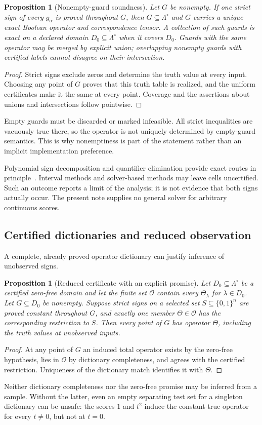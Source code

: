 \documentclass[11pt]{article}
\newtheorem{proposition}[theorem]{Proposition}
\theoremstyle{definition}
\theoremstyle{remark}
\newcommand{\B}{\{0,1\}}
\newcommand{\Oo}{\mathcal O}
\begin{document}
\begin{proposition}[Nonempty-guard soundness]\label{prop:cert}
Let $G$ be nonempty. If one strict sign of every $g_\alpha$ is proved throughout $G$, then $G\subseteq\Lambda^\circ$ and $G$ carries a unique exact Boolean operator and correspondence tensor. A collection of such guards is exact on a declared domain $D_0\subseteq\Lambda^\circ$ when it covers $D_0$. Guards with the same operator may be merged by explicit union; overlapping nonempty guards with certified labels cannot disagree on their intersection.
\end{proposition}
\begin{proof}
Strict signs exclude zeros and determine the truth value at every input. Choosing any point of $G$ proves that this truth table is realized, and the uniform certificates make it the same at every point. Coverage and the assertions about unions and intersections follow pointwise.
\end{proof}
Empty guards must be discarded or marked infeasible. All strict inequalities are vacuously true there, so the operator is not uniquely determined by empty-guard semantics. This is why nonemptiness is part of the statement rather than an implicit implementation preference.

Polynomial sign decomposition and quantifier elimination provide exact routes in principle~\cite{BPR2006,JPS2010}. Interval methods and solver-based methods may leave cells uncertified. Such an outcome reports a limit of the analysis; it is not evidence that both signs actually occur. The present note supplies no general solver for arbitrary continuous scores.

\subsection{Certified dictionaries and reduced observation}
A complete, already proved operator dictionary can justify inference of unobserved signs.
\begin{proposition}[Reduced certificate with an explicit promise]\label{prop:reduced}
Let $D_0\subseteq\Lambda^\circ$ be a certified zero-free domain and let the finite set $\Oo$ contain every $\Theta_\lambda$ for $\lambda\in D_0$. Let $G\subseteq D_0$ be nonempty. Suppose strict signs on a selected set $S\subseteq\B^n$ are proved constant throughout $G$, and exactly one member $\Theta\in\Oo$ has the corresponding restriction to $S$. Then every point of $G$ has operator $\Theta$, including the truth values at unobserved inputs.
\end{proposition}
\begin{proof}
At any point of $G$ an induced total operator exists by the zero-free hypothesis, lies in $\Oo$ by dictionary completeness, and agrees with the certified restriction. Uniqueness of the dictionary match identifies it with $\Theta$.
\end{proof}
Neither dictionary completeness nor the zero-free promise may be inferred from a sample. Without the latter, even an empty separating test set for a singleton dictionary can be unsafe: the scores $1$ and $t^2$ induce the constant-true operator for every $t\ne0$, but not at $t=0$.
\end{document}
